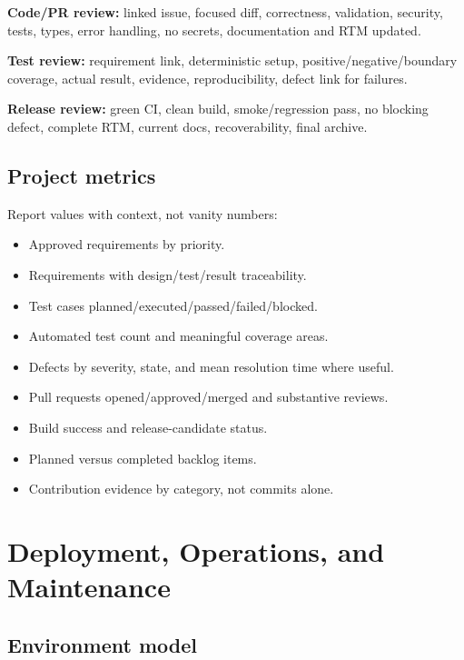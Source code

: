 \documentclass[
  10pt,
  a4paper,
  oneside]{report}
\providecommand{\tightlist}{%
  \setlength{\itemsep}{0pt}\setlength{\parskip}{0pt}}
\begin{document}
\textbf{Code/PR review:} linked issue, focused diff, correctness,
validation, security, tests, types, error handling, no secrets,
documentation and RTM updated.

\textbf{Test review:} requirement link, deterministic setup,
positive/negative/boundary coverage, actual result, evidence,
reproducibility, defect link for failures.

\textbf{Release review:} green CI, clean build, smoke/regression pass,
no blocking defect, complete RTM, current docs, recoverability, final
archive.

\section{Project metrics}\label{212-project-metrics}

Report values with context, not vanity numbers:

\begin{itemize}
\tightlist
\item
  Approved requirements by priority.
\item
  Requirements with design/test/result traceability.
\item
  Test cases planned/executed/passed/failed/blocked.
\item
  Automated test count and meaningful coverage areas.
\item
  Defects by severity, state, and mean resolution time where useful.
\item
  Pull requests opened/approved/merged and substantive reviews.
\item
  Build success and release-candidate status.
\item
  Planned versus completed backlog items.
\item
  Contribution evidence by category, not commits alone.
\end{itemize}

\chapter{Deployment, Operations, and
Maintenance}\label{22-deployment-operations-and-maintenance}

\section{Environment model}\label{221-environment-model}
\end{document}
